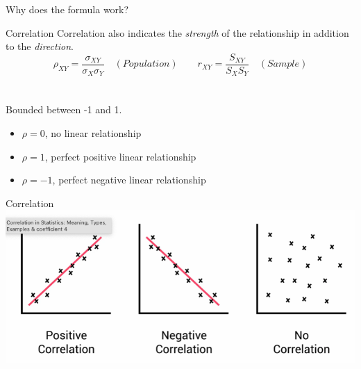 \documentclass{./../div_teaching_slides}
\begin{document}
\begin{frame}{Why does the formula work?}
\centering
{}
\end{frame}

\begin{frame}{Correlation}
Correlation also indicates the \textit{strength} of the relationship in addition to the \textit{direction}.
$$ \rho_{XY} = \frac{ \sigma_{XY}}{\sigma_X \sigma_Y}  \quad (Population) \quad \quad r_{XY} = \frac{ S_{XY}}{S_X S_Y} \quad (Sample) $$ \\~\\

Bounded between -1 and 1. 
\begin{itemize}
  \item $\rho = 0$, no linear relationship
  \item $\rho = 1$, perfect positive linear relationship
  \item $\rho = -1$, perfect negative  linear relationship
\end{itemize}

\end{frame}

\begin{frame}{Correlation}
\includegraphics[scale=0.525]{corr}
\end{frame}
\end{document}
